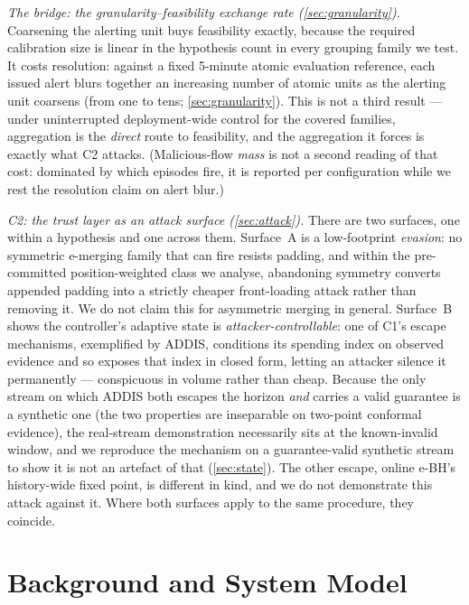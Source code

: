 \documentclass[conference]{IEEEtran}
\begin{document}
\emph{The bridge: the granularity--feasibility exchange rate (\cref{sec:granularity}).} Coarsening the
alerting unit buys feasibility exactly, because the required calibration
size is linear in the hypothesis count in every grouping family we test. It costs resolution:
against a fixed 5-minute atomic evaluation reference, each issued alert blurs together an increasing
number of atomic units as the alerting unit coarsens (from one to tens; \cref{sec:granularity}). This
is not a third result --- under uninterrupted deployment-wide control for the covered families,
aggregation is the \emph{direct} route to feasibility, and the aggregation it forces is exactly what C2
attacks. (Malicious-flow \emph{mass} is not a second reading of that cost: dominated by which episodes
fire, it is reported per configuration while we rest the resolution claim on alert blur.)

\emph{C2: the trust layer as an attack surface (\cref{sec:attack}).} There are two surfaces, one within
a hypothesis and one across them. Surface~A is a low-footprint \emph{evasion}: no symmetric e-merging
family that can fire resists padding, and within the pre-committed position-weighted class we
analyse, abandoning symmetry converts appended padding into a strictly cheaper front-loading attack
rather than removing it. We do not claim this for asymmetric merging in general. Surface~B shows the controller's adaptive state is \emph{attacker-controllable}: one of
C1's escape mechanisms, exemplified by ADDIS, conditions its spending index on observed evidence and so
exposes that index in closed form, letting an attacker silence it permanently --- conspicuous in volume
rather than cheap. Because the only stream on which ADDIS both escapes the horizon \emph{and} carries
a valid guarantee is a synthetic one (the two properties are inseparable on two-point conformal
evidence), the real-stream demonstration necessarily sits at the known-invalid window, and we
reproduce the mechanism on a guarantee-valid synthetic stream to show it is not an artefact of that
(\cref{sec:state}). The other escape, online e-BH's history-wide fixed point, is different in kind, and
we do not demonstrate this attack against it. Where both surfaces apply to the same procedure, they
coincide.

\section{Background and System Model}\label{sec:background}
\end{document}
